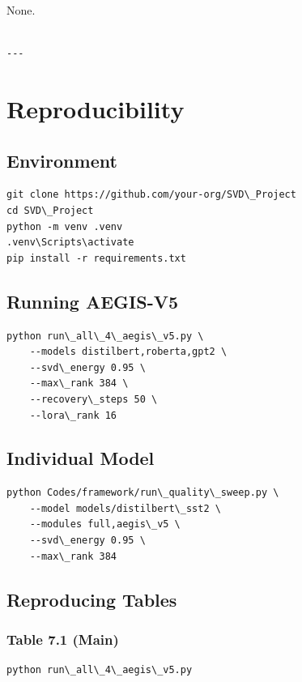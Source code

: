None.
\begin{lstlisting}

---
\end{lstlisting}

\section{Reproducibility}

\subsection{Environment}

\begin{lstlisting}
git clone https://github.com/your-org/SVD\_Project
cd SVD\_Project
python -m venv .venv
.venv\Scripts\activate
pip install -r requirements.txt
\end{lstlisting}

\subsection{Running AEGIS-V5}

\begin{lstlisting}
python run\_all\_4\_aegis\_v5.py \
    --models distilbert,roberta,gpt2 \
    --svd\_energy 0.95 \
    --max\_rank 384 \
    --recovery\_steps 50 \
    --lora\_rank 16
\end{lstlisting}

\subsection{Individual Model}

\begin{lstlisting}
python Codes/framework/run\_quality\_sweep.py \
    --model models/distilbert\_sst2 \
    --modules full,aegis\_v5 \
    --svd\_energy 0.95 \
    --max\_rank 384
\end{lstlisting}

\subsection{Reproducing Tables}

\subsubsection{Table 7.1 (Main)}
\begin{lstlisting}
python run\_all\_4\_aegis\_v5.py
\end{lstlisting}

